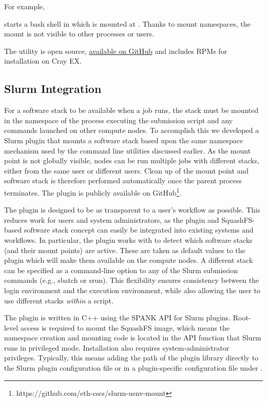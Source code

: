 For example,



starts a bash shell in which  is mounted at .
Thanks to mount namespaces, the mount is not visible to other processes or users.

The utility is open source, \href{https://github.com/eth-cscs/squashfs-mount}{available on GitHub} and includes RPMs for installation on Cray EX.

\subsection{Slurm Integration}

For a software stack to be available when a job runs, the stack must be mounted in the namespace of the process executing the submission script and any commands launched on other compute nodes.
To accomplish this we developed a Slurm plugin that mounts a software stack based upon the same namespace mechanism used by the command line utilities discussed earlier.
As the mount point is not globally visible, nodes can be run multiple jobs with different stacks, either from the same user or different users.
Clean up of the mount point and software stack is therefore performed automatically once the parent process terminates.
The plugin is publicly available on GitHub\footnote{https://github.com/eth-cscs/slurm-uenv-mount}.

The plugin is designed to be as transparent to a user's workflow as possible.
This reduces work for users and system administrators, as the plugin and SquashFS-based software stack concept can easily be integrated into existing systems and workflows.
In particular, the plugin works with  to detect which software stacks (and their mount points) are active.
These are taken as default values to the plugin which will make them available on the compute nodes.
A different stack can be specified as a command-line option to any of the Slurm submission commands (e.g., sbatch or srun).
This flexibility ensures consistency between the login environment and the execution environment, while also allowing the user to use different stacks \emph{within} a script.

The plugin is written in C++ using the SPANK API for Slurm plugins.
Root-level access is required to mount the SquashFS image, which means the namespace creation and mounting code is located in the API function that Slurm runs in privileged mode.
Installation also requires system-administrator privileges.
Typically, this means adding the path of the plugin library directly to the Slurm plugin configuration file  or in a plugin-specific configuration file under .

